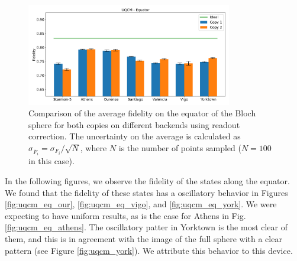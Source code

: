 \begin{figure}[H]
    \centering
            \includegraphics[width=0.8\textwidth]{Figures/UQCM/Histograms/histo_equator.png}
        
        \caption{Comparison of the average fidelity on the equator of the Bloch sphere for both copies on different backends using readout correction. The uncertainty on the average is calculated as $\sigma_{\overline{F}_i}=\sigma_{F_i}/\sqrt{N}$, where $N$ is the number of points sampled ($N=100$ in this case).}\label{fig:hist_uqcm_eq}
\end{figure} 

In the following figures, we observe the fidelity of the states along the equator. We found that the fidelity of these states has a oscillatory behavior in Figures \ref{fig:uqcm_eq_our}, \ref{fig:uqcm_eq_vigo}, and \ref{fig:uqcm_eq_york}. We were expecting to have uniform results, as is the case for Athens in Fig. \ref{fig:uqcm_eq_athens}. The oscillatory patter in Yorktown is the most clear of them, and this is in agreement with the image of the full sphere with a clear pattern (see Figure \ref{fig:uqcm_york}). We attribute this behavior to this device.  

